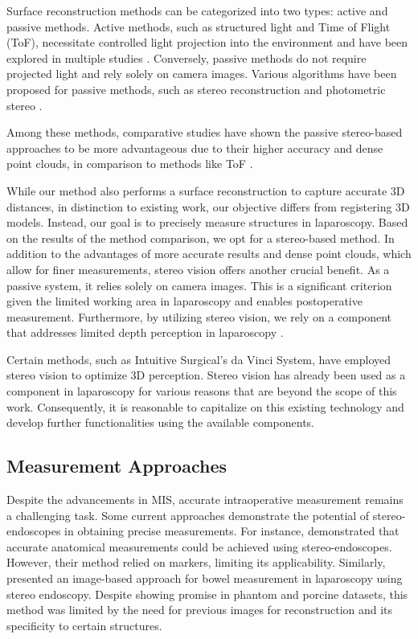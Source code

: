 \documentclass[letterpaper]{article} %
\begin{document}
Surface reconstruction methods can be categorized into two types: active and passive methods. Active methods, such as structured light and Time of Flight (ToF), necessitate controlled light projection into the environment and have been explored in multiple studies \cite{ackerman_surface_2002, maurice_structured_2012, maier-hein_comparative_2014}. Conversely, passive methods do not require projected light and rely solely on camera images. Various algorithms have been proposed for passive methods, such as stereo reconstruction and photometric stereo \cite{kittler_real-time_2013, hutchison_3d_2013, rohl_real-time_2011, hutchison_3d_2012, malti_combining_2014}.

Among these methods, comparative studies have shown the passive stereo-based approaches to be more advantageous due to their higher accuracy and dense point clouds, in comparison to methods like ToF \cite{maier-hein_comparative_2014, groch_3d_2011}.

While our method also performs a surface reconstruction to capture accurate 3D distances, in distinction to existing work, our objective differs from registering 3D models. Instead, our goal is to precisely measure structures in laparoscopy. Based on the results of the method comparison, we opt for a stereo-based method. In addition to the advantages of more accurate results and dense point clouds, which allow for finer measurements, stereo vision offers another crucial benefit. As a passive system, it relies solely on camera images. This is a significant criterion given the limited working area in laparoscopy and enables postoperative measurement. Furthermore, by utilizing stereo vision, we rely on a component that addresses limited depth perception in laparoscopy \cite{way_causes_2003}.

Certain methods, such as Intuitive Surgical's da Vinci System, have employed stereo vision to optimize 3D perception. Stereo vision has already been used as a component in laparoscopy for various reasons that are beyond the scope of this work. Consequently, it is reasonable to capitalize on this existing technology and develop further functionalities using the available components.

\subsection{Measurement Approaches}

Despite the advancements in MIS, accurate intraoperative measurement remains a challenging task. Some current approaches demonstrate the potential of stereo-endoscopes in obtaining precise measurements. For instance, \citet{field_stereo_2009} demonstrated that accurate anatomical measurements could be achieved using stereo-endoscopes. However, their method relied on markers, limiting its applicability. Similarly, \citet{bodenstedt_image-based_2016} presented an image-based approach for bowel measurement in laparoscopy using stereo endoscopy. Despite showing promise in phantom and porcine datasets, this method was limited by the need for previous images for reconstruction and its specificity to certain structures.
\end{document}
